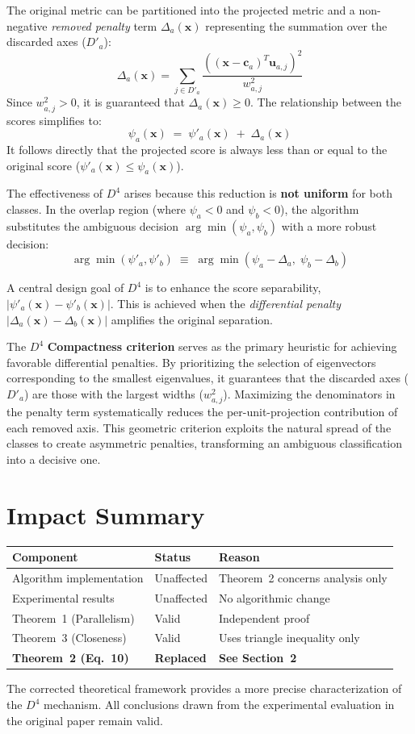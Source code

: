 \documentclass[11pt,a4paper]{article}
\begin{document}
	The original metric can be partitioned into the projected metric and a non-negative \emph{removed penalty} term $\Delta_a(\mathbf{x})$ representing the summation over the discarded axes ($D'_a$):
	\[
	\Delta_a(\mathbf{x}) = \sum_{j \in D'_a} \frac{((\mathbf{x}-\mathbf{c}_a)^T \mathbf{u}_{a,j})^2}{w_{a,j}^2}
	\]
	Since $w_{a,j}^2 > 0$, it is guaranteed that $\Delta_a(\mathbf{x}) \ge 0$. The relationship between the scores simplifies to:
	\[
	\psi_a(\mathbf{x}) \;=\; \psi'_a(\mathbf{x}) \;+\; \Delta_a(\mathbf{x})
	\]
	It follows directly that the projected score is always less than or equal to the original score ($\psi'_a(\mathbf{x})\le\psi_a(\mathbf{x})$).

	The effectiveness of $D^4$ arises because this reduction is \textbf{not uniform} for both classes. In the overlap region (where $\psi_a < 0$ and $\psi_b < 0$), the algorithm substitutes the ambiguous decision $\arg\min(\psi_a,\psi_b)$ with a more robust decision:
	\[
	\arg\min\!\left(\psi'_a,\psi'_b\right)
	\;\equiv\;
	\arg\min\!\left(\psi_a-\Delta_a,\;\psi_b-\Delta_b\right)
	\]

	A central design goal of $D^4$ is to enhance the score separability, $|\psi'_a(\mathbf{x})-\psi'_b(\mathbf{x})|$. This is achieved when the \emph{differential penalty} $|\Delta_a(\mathbf{x})-\Delta_b(\mathbf{x})|$ amplifies the original separation.

	The $D^4$ \textbf{Compactness criterion} serves as the primary heuristic for achieving favorable differential penalties. By prioritizing the selection of eigenvectors corresponding to the smallest eigenvalues, it guarantees that the discarded axes ($D'_a$) are those with the largest widths ($w_{a,j}^2$). Maximizing the denominators in the penalty term systematically reduces the per-unit-projection contribution of each removed axis. This geometric criterion exploits the natural spread of the classes to create asymmetric penalties, transforming an ambiguous classification into a decisive one.
	
	\section{Impact Summary}
	
	\begin{table}[h]
		\centering
		\small
		\begin{tabular}{@{}l l p{5.5cm}@{}}
			\toprule
			\textbf{Component} & \textbf{Status} & \textbf{Reason} \\
			\midrule
			Algorithm implementation & Unaffected & Theorem~2 concerns analysis only \\
			Experimental results & Unaffected & No algorithmic change \\
			Theorem~1 (Parallelism) & Valid & Independent proof \\
			Theorem~3 (Closeness) & Valid & Uses triangle inequality only \\
			\textbf{Theorem~2 (Eq.~10)} & \textbf{Replaced} & \textbf{See Section~2} \\
			\bottomrule
		\end{tabular}
	\end{table}
	
	\noindent
	The corrected theoretical framework provides a more precise characterization of the $D^4$ mechanism. All conclusions drawn from the experimental evaluation in the original paper remain valid.
	
\end{document}
